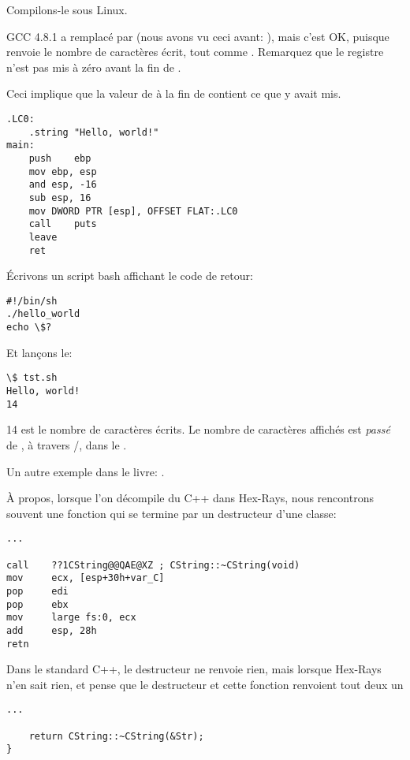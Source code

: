 Compilons-le sous Linux.

GCC 4.8.1 a remplacé \printf par \puts (nous avons vu ceci avant: ),
mais c'est OK, puisque \puts renvoie le nombre de caractères écrit, tout comme
\printf.
Remarquez que le registre \EAX n'est pas mis à zéro avant la fin de \main.

Ceci implique que la valeur de \EAX à la fin de \main contient ce que \puts y avait mis.

\begin{lstlisting}[caption=GCC 4.8.1,style=customasmx86]
.LC0:
	.string	"Hello, world!"
main:
	push	ebp
	mov	ebp, esp
	and	esp, -16
	sub	esp, 16
	mov	DWORD PTR [esp], OFFSET FLAT:.LC0
	call	puts
	leave
	ret
\end{lstlisting}


Écrivons un script bash affichant le code de retour:

\begin{lstlisting}[caption=tst.sh]
#!/bin/sh
./hello_world
echo \$?
\end{lstlisting}

Et lançons le:

\begin{lstlisting}
\$ tst.sh 
Hello, world!
14
\end{lstlisting}

14 est le nombre de caractères écrits.
Le nombre de caractères affichés est \textit{passé} de \printf{}, à travers /, dans le .

Un autre exemple dans le livre: .

À propos, lorsque l'on décompile du C++ dans Hex-Rays, nous rencontrons souvent
une fonction qui se termine par un destructeur d'une classe:

\begin{lstlisting}[style=customasmx86]
...

call    ??1CString@@QAE@XZ ; CString::~CString(void)
mov     ecx, [esp+30h+var_C]
pop     edi
pop     ebx
mov     large fs:0, ecx
add     esp, 28h
retn
\end{lstlisting}

Dans le standard C++, le destructeur ne renvoie rien, mais lorsque Hex-Rays n'en %
sait rien, et pense que le destructeur et cette fonction renvoient tout deux un \Tint

\begin{lstlisting}[style=customc]
...

	return CString::~CString(&Str);
}
\end{lstlisting}

